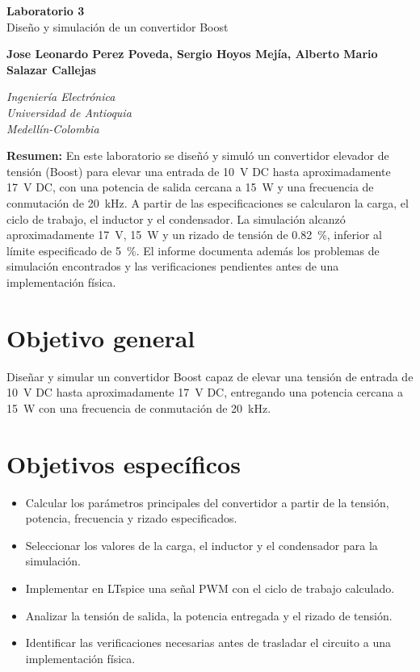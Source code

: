 \documentclass[12pt]{article}
\newcommand{\estudiantes}{Jose Leonardo Perez Poveda, Sergio Hoyos Mejía, Alberto Mario Salazar Callejas}
\begin{document}
\vspace*{-1cm}
\begin{center}
{\Huge\textcolor{tituloazul}{\textbf{Laboratorio 3}\\Diseño y simulación de un convertidor Boost}}
\vspace{0.2cm}

{\textbf{\estudiantes}}
\vspace{0.2cm}

\textit{Ingeniería Electrónica}\\
\textit{Universidad de Antioquia}\\
\textit{Medellín-Colombia}
\end{center}
\vspace{0.3cm}

\noindent\textcolor{tituloazul}{\textbf{Resumen:}} En este laboratorio se diseñó y simuló un convertidor elevador de tensión (Boost) para elevar una entrada de \SI{10}{V} DC hasta aproximadamente \SI{17}{V} DC, con una potencia de salida cercana a \SI{15}{W} y una frecuencia de conmutación de \SI{20}{kHz}. A partir de las especificaciones se calcularon la carga, el ciclo de trabajo, el inductor y el condensador. La simulación alcanzó aproximadamente \SI{17}{V}, \SI{15}{W} y un rizado de tensión de \SI{0.82}{\percent}, inferior al límite especificado de \SI{5}{\percent}. El informe documenta además los problemas de simulación encontrados y las verificaciones pendientes antes de una implementación física.

\section{Objetivo general}
Diseñar y simular un convertidor Boost capaz de elevar una tensión de entrada de \SI{10}{V} DC hasta aproximadamente \SI{17}{V} DC, entregando una potencia cercana a \SI{15}{W} con una frecuencia de conmutación de \SI{20}{kHz}.

\section{Objetivos específicos}
\begin{itemize}
\item Calcular los parámetros principales del convertidor a partir de la tensión, potencia, frecuencia y rizado especificados.
\item Seleccionar los valores de la carga, el inductor y el condensador para la simulación.
\item Implementar en LTspice una señal PWM con el ciclo de trabajo calculado.
\item Analizar la tensión de salida, la potencia entregada y el rizado de tensión.
\item Identificar las verificaciones necesarias antes de trasladar el circuito a una implementación física.
\end{itemize}
\end{document}
